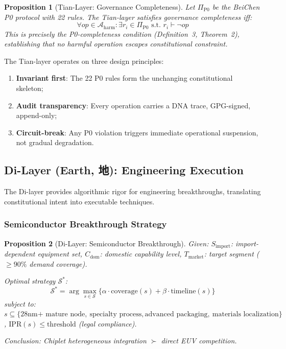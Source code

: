 \documentclass[conference]{IEEEtran}
\newtheorem{proposition}{Proposition}
\begin{document}
\begin{proposition}[Tian-Layer: Governance Completeness]
Let $\Pi_{\text{P0}}$ be the BeiChen P0 protocol with 22 rules.
The Tian-layer satisfies governance completeness iff:
\begin{equation}
  \forall op \in \mathcal{A}_{\text{harm}}:
  \exists r_i \in \Pi_{\text{P0}} \text{ s.t. } r_i \vdash \neg op
\end{equation}
This is precisely the P0-completeness condition
(Definition~3, Theorem~2), establishing that no harmful
operation escapes constitutional constraint.
\end{proposition}

The Tian-layer operates on three design principles:
\begin{enumerate}
  \item \textbf{Invariant first}: The 22 P0 rules form the
    unchanging constitutional skeleton;
  \item \textbf{Audit transparency}: Every operation carries
    a DNA trace, GPG-signed, append-only;
  \item \textbf{Circuit-break}: Any P0 violation triggers
    immediate operational suspension, not gradual degradation.
\end{enumerate}

\subsection{Di-Layer (Earth, 地): Engineering Execution}

The Di-layer provides algorithmic rigor for engineering
breakthroughs, translating constitutional intent into
executable techniques.

\subsubsection{Semiconductor Breakthrough Strategy}

\begin{proposition}[Di-Layer: Semiconductor Breakthrough]
Given:
  $S_{\text{import}}$: import-dependent equipment set,
  $C_{\text{dom}}$: domestic capability level,
  $T_{\text{market}}$: target segment ($\geq 90\%$ demand coverage).

Optimal strategy $\mathcal{S}^*$:
\begin{equation}
  \mathcal{S}^* = \arg\max_{s \in \mathcal{S}}
  \{\alpha \cdot \text{coverage}(s) + \beta \cdot \text{timeline}(s)\}
\end{equation}
subject to:
  $s \subseteq \{\text{28nm+ mature node},\ \text{specialty process},
                \text{advanced packaging},\ \text{materials localization}\}$,
  $\text{IPR}(s) \leq \text{threshold}$ (legal compliance).

Conclusion: Chiplet heterogeneous integration $\succ$ direct EUV competition.
\end{proposition}
\end{document}
